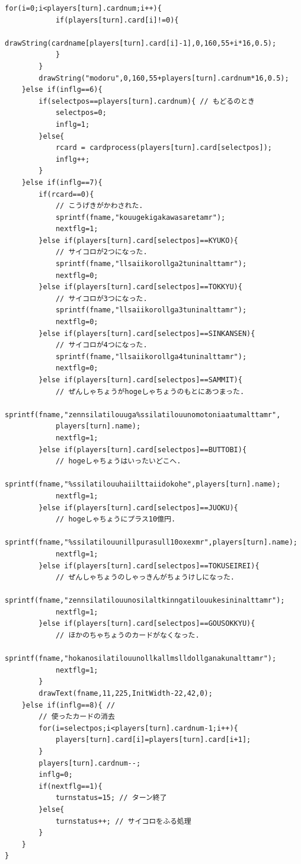 \documentclass[a4j]{jarticle}
\begin{document}
\begin{lstlisting}[basicstyle=\ttfamily\footnotesize, frame=single,label=startTurn,caption=startTurn関数]
        for(i=0;i<players[turn].cardnum;i++){
            if(players[turn].card[i]!=0){
                drawString(cardname[players[turn].card[i]-1],0,160,55+i*16,0.5);                   
            }
        }
        drawString("modoru",0,160,55+players[turn].cardnum*16,0.5);
    }else if(inflg==6){
        if(selectpos==players[turn].cardnum){ // もどるのとき
            selectpos=0;
            inflg=1;
        }else{
            rcard = cardprocess(players[turn].card[selectpos]);
            inflg++;
        }
    }else if(inflg==7){
        if(rcard==0){
            // こうげきがかわされた.
            sprintf(fname,"kouugekigakawasaretamr");
            nextflg=1;
        }else if(players[turn].card[selectpos]==KYUKO){
            // サイコロが2つになった.
            sprintf(fname,"llsaiikorollga2tuninalttamr");
            nextflg=0;
        }else if(players[turn].card[selectpos]==TOKKYU){
            // サイコロが3つになった.
            sprintf(fname,"llsaiikorollga3tuninalttamr");
            nextflg=0;
        }else if(players[turn].card[selectpos]==SINKANSEN){
            // サイコロが4つになった.
            sprintf(fname,"llsaiikorollga4tuninalttamr");
            nextflg=0;
        }else if(players[turn].card[selectpos]==SAMMIT){
            // ぜんしゃちょうがhogeしゃちょうのもとにあつまった.
            sprintf(fname,"zennsilatilouuga%ssilatilouunomotoniaatumalttamr",
            players[turn].name);
            nextflg=1;
        }else if(players[turn].card[selectpos]==BUTTOBI){
            // hogeしゃちょうはいったいどこへ.
            sprintf(fname,"%ssilatilouuhaiilttaiidokohe",players[turn].name);
            nextflg=1;
        }else if(players[turn].card[selectpos]==JUOKU){
            // hogeしゃちょうにプラス10億円.
            sprintf(fname,"%ssilatilouunillpurasull10oxexmr",players[turn].name);
            nextflg=1;
        }else if(players[turn].card[selectpos]==TOKUSEIREI){
            // ぜんしゃちょうのしゃっきんがちょうけしになった.
            sprintf(fname,"zennsilatilouunosilaltkinngatilouukesininalttamr");
            nextflg=1;
        }else if(players[turn].card[selectpos]==GOUSOKKYU){
            // ほかのちゃちょうのカードがなくなった.
            sprintf(fname,"hokanosilatilouunollkallmslldollganakunalttamr");
            nextflg=1;
        }
        drawText(fname,11,225,InitWidth-22,42,0);      
    }else if(inflg==8){ // 
        // 使ったカードの消去
        for(i=selectpos;i<players[turn].cardnum-1;i++){
            players[turn].card[i]=players[turn].card[i+1];
        }
        players[turn].cardnum--;
        inflg=0;
        if(nextflg==1){
            turnstatus=15; // ターン終了 
        }else{
            turnstatus++; // サイコロをふる処理
        }     
    }
}
        \end{lstlisting}    
\end{document}
